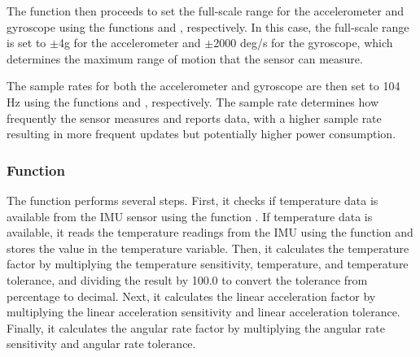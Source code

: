 The function then proceeds to set the full-scale range for the accelerometer and gyroscope using the functions  and , respectively. In this case, the full-scale range is set to $\pm$4g for the accelerometer and $\pm$2000 deg/s for the gyroscope, which determines the maximum range of motion that the sensor can measure.

The sample rates for both the accelerometer and gyroscope are then set to 104 Hz using the functions  and , respectively. The sample rate determines how frequently the sensor measures and reports data, with a higher sample rate resulting in more frequent updates but potentially higher power consumption.

\subsubsection{Function }

The function  performs several steps. First, it checks if temperature data is available from the IMU sensor using the function . If temperature data is available, it reads the temperature readings from the IMU using the function  and stores the value in the temperature variable. Then, it calculates the temperature factor by multiplying the temperature sensitivity, temperature, and temperature tolerance, and dividing the result by 100.0 to convert the tolerance from percentage to decimal. Next, it calculates the linear acceleration factor by multiplying the linear acceleration sensitivity and linear acceleration tolerance. Finally, it calculates the angular rate factor by multiplying the angular rate sensitivity and angular rate tolerance.

